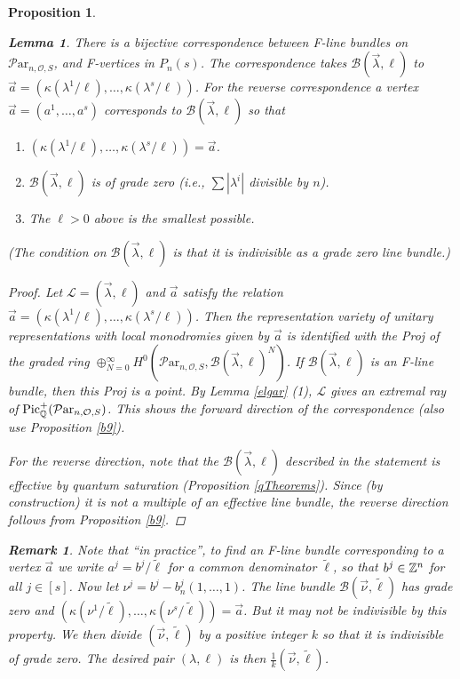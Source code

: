 \documentclass[11pt]{amsart}
\newcommand\Pic{\operatorname{Pic}}
\newcommand\ml{\mathcal{L}}
\newcommand\Par{\mathcal{P}\text{ar} }
\newtheorem{remark}[theorem]{ Remark}
\newtheorem{proposition}[theorem]{Proposition}
\newtheorem{lemma}[theorem]{Lemma}
\numberwithin{theorem}{subsection}
\begin{document}
{\begin{proposition}
\begin{lemma}\label{corresp}
There is a bijective correspondence between F-line bundles on $\Par_{n,\mathcal{O},S}$, and F-vertices in $P_n(s)$. The correspondence takes $\mathcal{B}(\vec{\lambda},\ell)$ to $\vec{a}=(\kappa(\lambda^1/\ell),\dots,\kappa(\lambda^s/\ell))$. For the reverse correspondence a vertex $\vec{a}=(a^1,\dots,a^s)$ corresponds to $\mathcal{B}(\vec{\lambda},\ell)$ so that
\begin{enumerate}
\item  $(\kappa(\lambda^1/\ell),\dots,\kappa(\lambda^s/\ell))=\vec{a}$.
\item $\mathcal{B}(\vec{\lambda},\ell)$ is of grade zero (i.e., $\sum |\lambda^i|$ divisible by $n$).
\item The $\ell>0$ above is the smallest possible.
\end{enumerate}
(The condition on $\mathcal{B}(\vec{\lambda},\ell)$ is that it is indivisible as a grade zero line bundle.)
\end{lemma}
\begin{proof}
Let $\ml=(\vec{\lambda},\ell)$ and $\vec{a}$ satisfy the relation $\vec{a}=(\kappa(\lambda^1/\ell),\dots,\kappa(\lambda^s/\ell))$. Then the representation variety of unitary representations with local monodromies given by $\vec{a}$ is identified with the Proj of the graded ring $\oplus_{N=0}^{\infty} H^0(\Par_{n,\mathcal{O},S}, \mathcal{B}(\vec{\lambda},\ell)^N)$. If $\mathcal{B}(\vec{\lambda},\ell)$
is an F-line bundle, then this Proj is a point.  By Lemma \ref{elgar} (1), $\ml$ gives an extremal ray  of $\Pic^+_{\Bbb{Q}}(\Par_{n,\mathcal{O},S})$. This shows the forward direction of the correspondence (also use Proposition \ref{b9}).

For the reverse direction, note that the $\mathcal{B}(\vec{\lambda},\ell)$ described in the statement is effective by quantum saturation (Proposition \ref{qTheorems}). Since (by construction) it is not a multiple of an effective line bundle, the reverse direction follows from Proposition \ref{b9}.
\end{proof}
\begin{remark}\label{inpractice}
Note that ``in practice'', to find an F-line bundle corresponding to a vertex $\vec{a}$ we write $a^j=b^j/\tilde{\ell}$ for a common denominator $\tilde{\ell}$, so that $b^j\in \Bbb{Z}^n$ for all $j\in[s]$. Now let $\nu^j=b^j-b^j_n(1,\dots,1)$.
The line bundle $\mathcal{B}(\vec{\nu},\tilde{\ell})$ has grade zero and $(\kappa(\nu^1/\tilde{\ell}),\dots,\kappa(\nu^s/\tilde{\ell}))=\vec{a}$. But it may not be indivisible by this property. We then divide $(\vec{\nu},\tilde{\ell})$ by a positive integer $k$ so that it is indivisible of grade zero. The desired pair $(\lambda,\ell)$ is then $\frac{1}{k}(\vec{\nu},\tilde{\ell})$.
\end{remark}


\end{proposition}}
\end{document}
